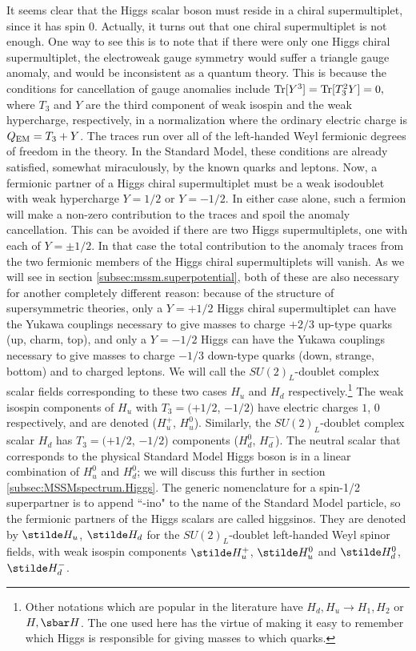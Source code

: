 It seems clear that the Higgs scalar boson must reside in a chiral
supermultiplet, since it has spin 0.
Actually, it turns out that one chiral supermultiplet
is not enough. One way to see this is to note that
if there were only one Higgs chiral supermultiplet,
the electroweak gauge symmetry would suffer a triangle gauge anomaly,
and would be inconsistent as a quantum theory.
This is because the conditions for cancellation of gauge
anomalies include
$
{\rm Tr}[Y^3] = {\rm Tr}[T_3^2 Y] = 0,
$
where $T_3$ and $Y$ are the third component of weak isospin and the
weak hypercharge, respectively, in a normalization where the
ordinary electric charge is $Q_{\rm EM} = T_3 + Y$. The traces
run over all of the left-handed
Weyl fermionic degrees of freedom in the theory. In the Standard Model,
these conditions are already satisfied, somewhat miraculously,
by the known quarks and leptons. Now, a fermionic partner of
a Higgs chiral supermultiplet must be a weak isodoublet
with weak hypercharge $Y=1/2$ or $Y=-1/2$. In either case alone,
such a fermion will make a non-zero contribution to the traces and spoil
the anomaly cancellation.
This can be avoided if there are two Higgs supermultiplets,
one with each of $Y=\pm 1/2$. In that case
the total contribution to the anomaly traces from the two
fermionic members of the Higgs chiral supermultiplets will vanish.
As we will see in section \ref{subsec:mssm.superpotential}, both of these
are also necessary for another completely different reason:
because of the structure of supersymmetric theories,
only a $Y=+1/2$ Higgs chiral
supermultiplet can have the Yukawa couplings necessary to give
masses to charge $+2/3$ up-type quarks (up, charm, top),
and only a $Y=-1/2$ Higgs can
have the Yukawa couplings necessary to give masses to
charge $-1/3$ down-type quarks (down, strange, bottom) and to
charged leptons.
We will call the $SU(2)_L$-doublet complex scalar fields corresponding to
these two cases $H_u$ and $H_d$
respectively.\footnote{Other notations which are popular in the
literature have $H_d,H_u \rightarrow H_1, H_2$ or $H,\sbar H$.
The one used here has the virtue of making it easy to remember which Higgs
is responsible for giving masses to which quarks.}
The weak isospin components of $H_u$ with $T_3=(+1/2$, $-1/2$) have
electric charges $1$, $0$ respectively, and are denoted ($H_u^+$,
$H_u^0$). Similarly, the $SU(2)_L$-doublet complex scalar $H_d$
has $T_3=(+1/2$, $-1/2$) components ($H_d^0$, $H_d^-$). The neutral
scalar that corresponds to the physical Standard Model
Higgs boson is in a linear combination of $H_u^0$ and $H_d^0$;
we will discuss this further in section \ref{subsec:MSSMspectrum.Higgs}.
The generic nomenclature
for a spin-1/2 superpartner is to append ``-ino" to the name of
the Standard Model particle, so the fermionic partners of the
Higgs scalars are called higgsinos. They are denoted by
$\stilde H_u$, $\stilde H_d$ for the $SU(2)_L$-doublet left-handed
Weyl spinor fields, with
weak isospin components $\stilde H_u^+$, $\stilde H_u^0$ and
$\stilde H_d^0$, $\stilde H_d^-$.

